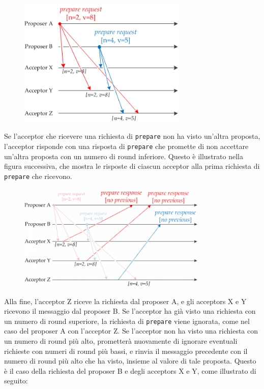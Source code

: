\begin{figure}[ht]
    \centering
    \includegraphics[width=8cm]{./Images/cap2/2.7.png}
    \label{fig:image2.7}
\end{figure}
\vspace{5mm}
Se l’acceptor che ricevere una richiesta di \texttt{prepare} non ha visto un’altra proposta, l’acceptor risponde con una risposta di \texttt{prepare} che promette di non accettare un’altra proposta con un numero di round inferiore. Questo è illustrato nella figura successiva, che mostra le risposte di ciascun acceptor alla prima richiesta di \texttt{prepare} che ricevono.
\clearpage

\begin{figure}[ht]
    \centering
    \includegraphics[width=9cm]{./Images/cap2/2.8.png}
    \label{fig:image2.8}
\end{figure}

Alla fine, l’acceptor Z riceve la richiesta dal proposer A, e gli acceptors X e Y ricevono il messaggio dal proposer B. Se l’acceptor ha già visto una richiesta con un numero di round superiore, la richiesta di \texttt{prepare} viene ignorata, come nel caso del proposer A con l’acceptor Z. Se l’acceptor non ha visto una richiesta con un numero di round più alto, prometterà nuovamente di ignorare eventuali richieste con numeri di round più bassi, e rinvia il messaggio precedente con il numero di round più alto che ha visto, insieme al valore di tale proposta. Questo è il caso della richiesta del proposer B e degli acceptors X e Y, come illustrato di seguito:

